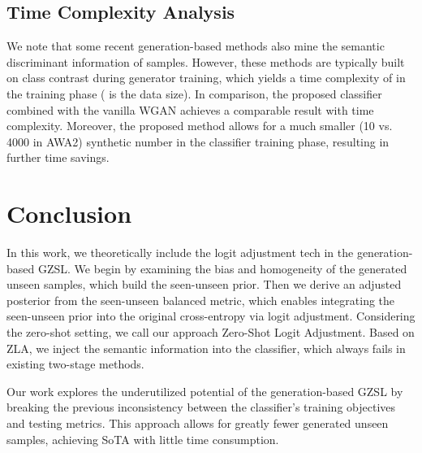 \documentclass{article}
\begin{document}
\subsection{Time Complexity Analysis}
We note that some recent generation-based methods \cite{han2021contrastive,chen2021semantics} also mine the semantic discriminant information of samples. However, these methods are typically built on class contrast during generator training, which yields a time complexity of  in the training phase ( is the data size). In comparison, the proposed classifier combined with the vanilla WGAN achieves a comparable result with  time complexity. Moreover, the proposed method allows for a much smaller (10 vs. 4000 in AWA2) synthetic number in the classifier training phase, resulting in further time savings.
\section{Conclusion}
In this work, we theoretically include the logit adjustment tech in the generation-based GZSL. We begin by examining the bias and homogeneity of the generated unseen samples, which build the seen-unseen prior. Then we derive an adjusted posterior from the seen-unseen balanced metric, which enables integrating the seen-unseen prior into the original cross-entropy via logit adjustment. Considering the zero-shot setting, we call our approach Zero-Shot Logit Adjustment. Based on ZLA, we inject the semantic information into the classifier, which always fails in existing two-stage methods.

Our work explores the underutilized potential of the generation-based GZSL by breaking the previous inconsistency between the classifier's training objectives and testing metrics. This approach allows for greatly fewer generated unseen samples, achieving SoTA with little time consumption.

{\small
	}
\end{document}
